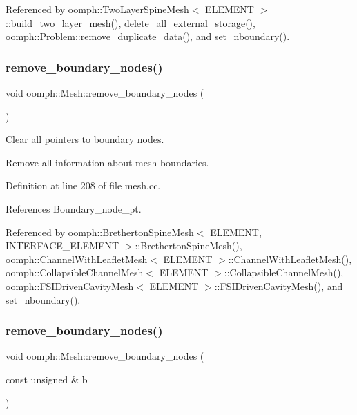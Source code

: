 Referenced by oomph\+::\+Two\+Layer\+Spine\+Mesh$<$ E\+L\+E\+M\+E\+N\+T $>$\+::build\+\_\+two\+\_\+layer\+\_\+mesh(), delete\+\_\+all\+\_\+external\+\_\+storage(), oomph\+::\+Problem\+::remove\+\_\+duplicate\+\_\+data(), and set\+\_\+nboundary().

\mbox{\label{classoomph_1_1Mesh_a8d86e14d55a1162e184bd7fac4630904}} 
\subsubsection{\texorpdfstring{remove\+\_\+boundary\+\_\+nodes()}{remove\_boundary\_nodes()}\hspace{0.1cm}{\footnotesize\ttfamily [1/2]}}
{\footnotesize\ttfamily void oomph\+::\+Mesh\+::remove\+\_\+boundary\+\_\+nodes (\begin{DoxyParamCaption}{ }\end{DoxyParamCaption})}



Clear all pointers to boundary nodes. 

Remove all information about mesh boundaries. 

Definition at line 208 of file mesh.\+cc.



References Boundary\+\_\+node\+\_\+pt.



Referenced by oomph\+::\+Bretherton\+Spine\+Mesh$<$ E\+L\+E\+M\+E\+N\+T, I\+N\+T\+E\+R\+F\+A\+C\+E\+\_\+\+E\+L\+E\+M\+E\+N\+T $>$\+::\+Bretherton\+Spine\+Mesh(), oomph\+::\+Channel\+With\+Leaflet\+Mesh$<$ E\+L\+E\+M\+E\+N\+T $>$\+::\+Channel\+With\+Leaflet\+Mesh(), oomph\+::\+Collapsible\+Channel\+Mesh$<$ E\+L\+E\+M\+E\+N\+T $>$\+::\+Collapsible\+Channel\+Mesh(), oomph\+::\+F\+S\+I\+Driven\+Cavity\+Mesh$<$ E\+L\+E\+M\+E\+N\+T $>$\+::\+F\+S\+I\+Driven\+Cavity\+Mesh(), and set\+\_\+nboundary().

\mbox{\label{classoomph_1_1Mesh_a5bf720135d0728907b98c5d31157f569}} 
\subsubsection{\texorpdfstring{remove\+\_\+boundary\+\_\+nodes()}{remove\_boundary\_nodes()}\hspace{0.1cm}{\footnotesize\ttfamily [2/2]}}
{\footnotesize\ttfamily void oomph\+::\+Mesh\+::remove\+\_\+boundary\+\_\+nodes (\begin{DoxyParamCaption}\item[{const unsigned \&}]{b }\end{DoxyParamCaption})}



